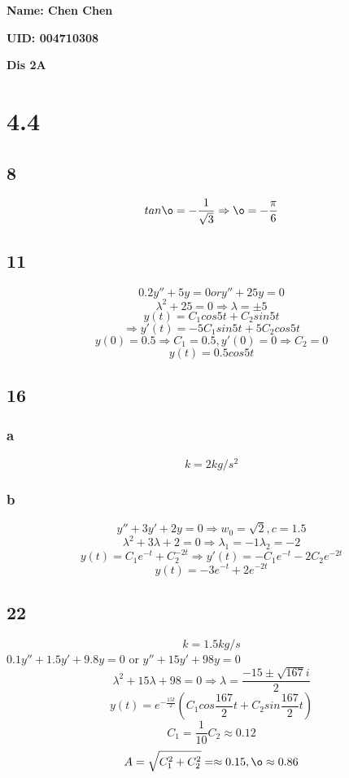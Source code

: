 \documentclass[12pt, a4paper]{IEEEtran}
\begin{document}
    \centerline{\textbf{Name: Chen Chen}}
    \centerline{\textbf{UID: 004710308}}
    \centerline{\textbf{Dis 2A}}

    \section*{4.4}
    
    \subsection*{8}
    \vspace{6cm}
    $$tan \o =-\frac{1}{\sqrt{3}}\Rightarrow \o=-\frac{\pi}{6}$$
    
    \subsection*{11}
    $$0.2y''+5y=0 or y''+25y=0$$
    $$\lambda^2+25=0\Rightarrow \lambda=\pm 5$$
    $$y(t)=C_1cos5t+C_2sin5t$$
    $$\Rightarrow y'(t)=-5C_1sin5t+5C_2cos5t$$
    $$y(0)=0.5\Rightarrow C_1=0.5, y'(0)=0\Rightarrow C_2=0$$
    $$y(t)=0.5cos5t$$
    \vspace{6cm}

    \subsection*{16}
    \subsubsection*{a}
    $$k=2kg/s^2$$
    \subsubsection*{b}
    $$y''+3y'+2y=0\Rightarrow w_0=\sqrt{2}, c=1.5$$
    $$\lambda^2+3\lambda+2=0\Rightarrow \lambda_1=-1 \lambda_2=-2$$
    $$y(t)=C_1e^{-t}+C_2^{-2t}\Rightarrow y'(t)=-C_1e^{-t}-2C_2e^{-2t}$$
    $$y(t)=-3e^{-t}+2e^{-2t}$$
    \vspace{6cm}

    \subsection*{22}
    $$k=1.5kg/s$$
    $0.1y''+1.5y'+9.8y=0$ or $y''+15y'+98y=0$
    $$\lambda^2+15\lambda+98=0\Rightarrow \lambda=\frac{-15\pm\sqrt{167}i}{2}$$
    $$y(t)=e^{-\frac{15t}{2}}(C_1cos\frac{167}{2}t+C_2sin\frac{167}{2}t)$$
    $$C_1=\frac{1}{10} C_2\approx 0.12$$
    $$A=\sqrt{C_1^2+C_2^2}=\approx 0.15, \o \approx 0.86$$
    \vspace{6cm}
\end{document}
